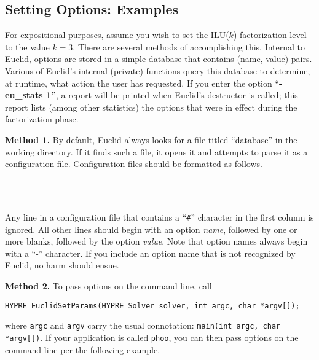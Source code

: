 
\subsection{Setting Options: Examples}

For expositional purposes, assume you wish to set the ILU($k$)
factorization level to the value $k = 3$.
There are several methods of accomplishing this.
Internal to Euclid, options are stored in a simple database that
contains (name, value) pairs.
Various of Euclid's internal (private) functions query this
database to determine, at runtime, what action the user
has requested.
If you enter the option ``{\bf -eu\_stats 1''}, a report will
be printed when Euclid's destructor is called; this
report lists (among other statistics) the options that
were in effect during the factorization phase.

{\bf Method 1.}
By default, Euclid always looks for a file titled
``database'' in the working directory. 
If it finds such a file, it opens it and attempts to parse it as
a configuration file.
Configuration files should be formatted as follows. 

\vspace{0.1in}
 \\
 \\
\vspace{0.1in}

Any line in a configuration file that contains a ``{\tt \#}''
character in the first column is ignored.
All other lines should begin with an option {\em name}, followed by
one or more blanks, followed by the option {\em value}.
Note that option names always begin with a ``-'' character.
If you include an option name that is not recognized by Euclid,
no harm should ensue.

{\bf Method 2.}
To pass options on the command line, call
\begin{display}
\begin{verbatim}
HYPRE_EuclidSetParams(HYPRE_Solver solver, int argc, char *argv[]);
\end{verbatim}
\end{display}
where {\tt argc} and {\tt argv} carry the usual connotation:
{\tt main(int argc, char *argv[])}.
If your \hypre{} application is called {\tt phoo}, you can
then pass options on the command line per the following example.

